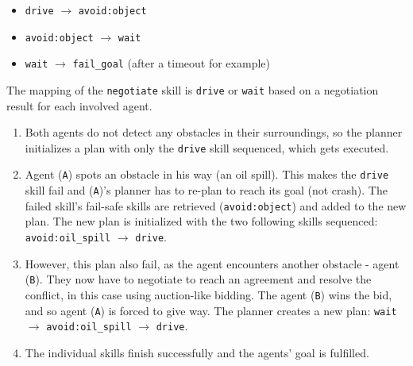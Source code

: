 \documentclass[main.tex]{subfiles}
\begin{document}
\begin{itemize}
    \item \texttt{drive} $\rightarrow$ \texttt{avoid:object}
    \item \texttt{avoid:object} $\rightarrow$ \texttt{wait}
    \item \texttt{wait} $\rightarrow$ \texttt{fail\_goal} (after a timeout for example)
\end{itemize}

The mapping of the \texttt{negotiate} skill is \texttt{drive} or \texttt{wait} based on 
a negotiation result for each involved agent.

\begin{enumerate}
    \item Both agents do not detect any obstacles in their surroundings, so the planner
    initializes a plan with only the \texttt{drive} skill sequenced, which gets executed. 

    \item Agent (\texttt{A}) spots an obstacle in his way (an oil spill). This makes the
    \texttt{drive} skill fail and (\texttt{A})'s planner has to re-plan to reach its goal (not
    crash). The failed skill's fail-safe skills are retrieved (\texttt{avoid:object})
    and added to the new plan. The new plan is initialized with the two
    following skills sequenced: \texttt{avoid:oil\_spill} $\rightarrow$ \texttt{drive}.
    
    \item However, this plan also fail, as the agent encounters another obstacle - agent
    (\texttt{B}). They now have to negotiate to reach an agreement and resolve the conflict, in
    this case using auction-like bidding. The agent (\texttt{B}) wins the bid, and so agent
    (\texttt{A}) is forced to give way. The planner creates a new plan: \texttt{wait}
    $\rightarrow$ \texttt{avoid:oil\_spill} $\rightarrow$ \texttt{drive}.

    \item The individual skills finish successfully and the agents' goal is fulfilled.
\end{enumerate}
\end{document}
